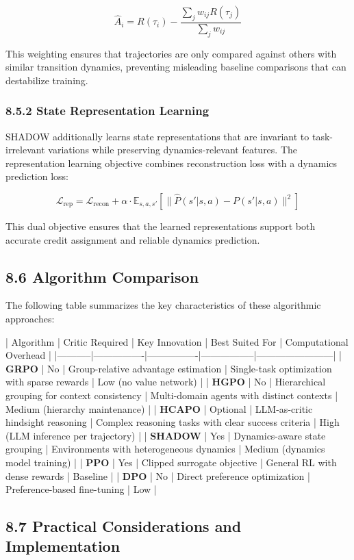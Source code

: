 $$\hat{A}_i = R(\tau_i) - \frac{\sum_{j} w_{ij} R(\tau_j)}{\sum_{j} w_{ij}}$$

This weighting ensures that trajectories are only compared against others with similar transition dynamics, preventing misleading baseline comparisons that can destabilize training.

\subsubsection{8.5.2 State Representation Learning}

SHADOW additionally learns state representations that are invariant to task-irrelevant variations while preserving dynamics-relevant features. The representation learning objective combines reconstruction loss with a dynamics prediction loss:

$$\mathcal{L}_{\text{rep}} = \mathcal{L}_{\text{recon}} + \alpha \cdot \mathbb{E}_{s,a,s'}\left[\|\hat{P}(s'|s,a) - P(s'|s,a)\|^2\right]$$

This dual objective ensures that the learned representations support both accurate credit assignment and reliable dynamics prediction.

\subsection{8.6 Algorithm Comparison}

The following table summarizes the key characteristics of these algorithmic approaches:

| Algorithm | Critic Required | Key Innovation | Best Suited For | Computational Overhead |
|-----------|----------------|----------------|-----------------|------------------------|
| \textbf{GRPO} | No | Group-relative advantage estimation | Single-task optimization with sparse rewards | Low (no value network) |
| \textbf{HGPO} | No | Hierarchical grouping for context consistency | Multi-domain agents with distinct contexts | Medium (hierarchy maintenance) |
| \textbf{HCAPO} | Optional | LLM-as-critic hindsight reasoning | Complex reasoning tasks with clear success criteria | High (LLM inference per trajectory) |
| \textbf{SHADOW} | Yes | Dynamics-aware state grouping | Environments with heterogeneous dynamics | Medium (dynamics model training) |
| \textbf{PPO} | Yes | Clipped surrogate objective | General RL with dense rewards | Baseline |
| \textbf{DPO} | No | Direct preference optimization | Preference-based fine-tuning | Low |

\subsection{8.7 Practical Considerations and Implementation}


